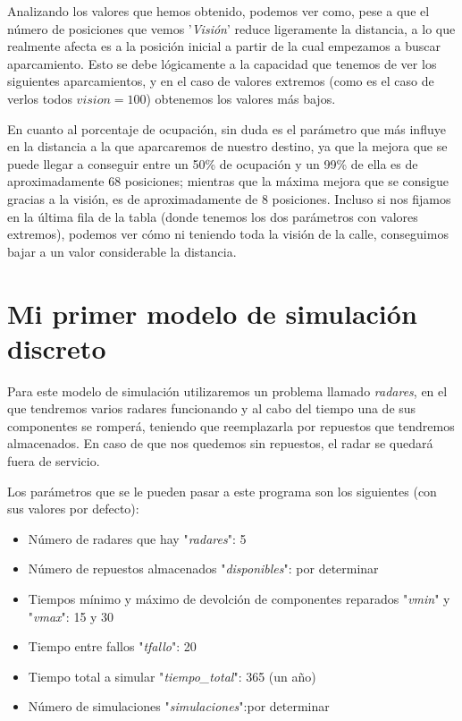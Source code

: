 \documentclass[11pt,a4paper]{report}
\begin{document}
Analizando los valores que hemos obtenido, podemos ver como, pese a que el número de posiciones que vemos '\textit{Visión}' reduce
ligeramente la distancia, a lo que realmente afecta es a la posición inicial a partir de la cual empezamos a buscar aparcamiento.
Esto se debe lógicamente a la capacidad que tenemos de ver los siguientes aparcamientos, y en el caso de valores extremos (como es
el caso de verlos todos $vision=100$) obtenemos los valores más bajos.

En cuanto al porcentaje de ocupación, sin duda es el parámetro que más influye en la distancia a la que aparcaremos de nuestro
destino, ya que la mejora que se puede llegar a conseguir entre un 50\% de ocupación y un 99\% de ella es de aproximadamente 68
posiciones; mientras que la máxima mejora que se consigue gracias a la visión, es de aproximadamente de 8 posiciones. Incluso si
nos fijamos en la última fila de la tabla (donde tenemos los dos parámetros con valores extremos), podemos ver cómo ni teniendo
toda la visión de la calle, conseguimos bajar a un valor considerable la distancia.



\chapter{Mi primer modelo de simulación discreto}

Para este modelo de simulación utilizaremos un problema llamado \textit{radares}, en el que tendremos varios radares funcionando y
al cabo del tiempo una de sus componentes se romperá, teniendo que reemplazarla por repuestos que tendremos almacenados. En caso
de que nos quedemos sin repuestos, el radar se quedará fuera de servicio.

Los parámetros que se le pueden pasar a este programa son los siguientes (con sus valores por defecto):
\begin{itemize}
	\item Número de radares que hay "\textit{radares}": 5
	\item Número de repuestos almacenados "\textit{disponibles}": por determinar
	\item Tiempos mínimo y máximo de devolción de componentes reparados "\textit{vmin}" y "\textit{vmax}": 15 y 30
	\item Tiempo entre fallos "\textit{tfallo}": 20
	\item Tiempo total a simular "\textit{tiempo\_total}": 365 (un año)
	\item Número de simulaciones "\textit{simulaciones}":por determinar
\end{itemize}
\end{document}
